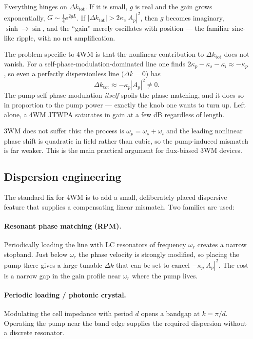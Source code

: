 Everything hinges on $\Delta k_{\mathrm{tot}}$. If it is small, $g$ is real and
the gain grows exponentially, $G\sim \tfrac14 e^{2gL}$. If
$|\Delta k_{\mathrm{tot}}| > 2\kappa_c|A_p|^{2}$, then $g$ becomes imaginary,
$\sinh\to\sin$, and the ``gain'' merely oscillates with position --- the
familiar $\mathrm{sinc}$-like ripple, with no net amplification.

The problem specific to 4WM is that the nonlinear contribution to
$\Delta k_{\mathrm{tot}}$ does not vanish. For a self-phase-modulation-dominated
line one finds $2\kappa_p - \kappa_s - \kappa_i \approx -\kappa_p$, so even a
perfectly dispersionless line ($\Delta k = 0$) has
\begin{equation}
  \Delta k_{\mathrm{tot}} \approx -\kappa_p |A_p|^{2} \neq 0 .
\end{equation}
The pump self-phase modulation \emph{itself} spoils the phase matching, and it
does so in proportion to the pump power --- exactly the knob one wants to turn
up. Left alone, a 4WM JTWPA saturates in gain at a few dB regardless of length.

3WM does not suffer this: the process is $\omega_p=\omega_s+\omega_i$ and the
leading nonlinear phase shift is quadratic in field rather than cubic, so the
pump-induced mismatch is far weaker. This is the main practical argument for
flux-biased 3WM devices.

\subsection{Dispersion engineering}

The standard fix for 4WM is to add a small, deliberately placed dispersive
feature that supplies a compensating linear mismatch. Two families are used:

\paragraph{Resonant phase matching (RPM).} Periodically loading the line with
LC resonators of frequency $\omega_r$ creates a narrow stopband. Just below
$\omega_r$ the phase velocity is strongly modified, so placing the pump there
gives a large tunable $\Delta k$ that can be set to cancel
$-\kappa_p|A_p|^{2}$. The cost is a narrow gap in the gain profile near
$\omega_r$ where the pump lives.

\paragraph{Periodic loading / photonic crystal.} Modulating the cell impedance
with period $d$ opens a bandgap at $k = \pi/d$. Operating the pump near the
band edge supplies the required dispersion without a discrete resonator.

